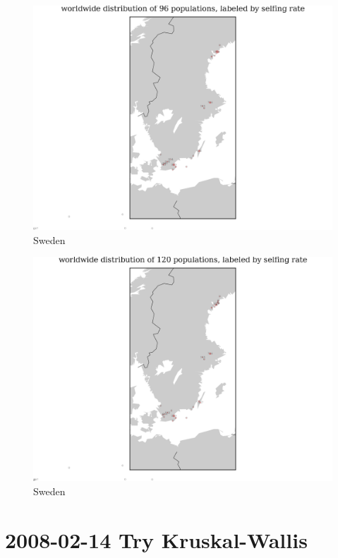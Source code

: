 \documentclass[a4paper,10pt]{article}
\begin{document}
\begin{figure}
\includegraphics[width=1\textwidth]{figures/s0829popid2ecotypeid_10_Swe_10_52_20_65_l3y1_pop_map.png}
\caption{Sweden}\label{f20}
\end{figure}

\begin{figure}
\includegraphics[width=1\textwidth]{figures/s0829popid2ecotypeid_5_Swe_10_52_20_65_l3y1_pop_map.png}
\caption{Sweden}\label{f19}
\end{figure}

\section{2008-02-14 Try Kruskal-Wallis}
\end{document}
